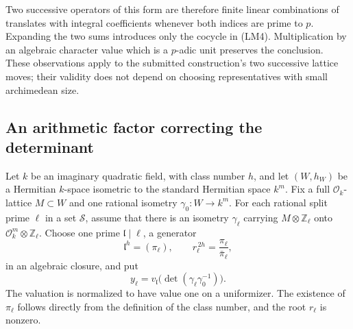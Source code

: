 Two successive operators of this form are therefore finite
linear combinations of translates with integral coefficients
whenever both indices are prime to $p$.  Expanding the two sums
introduces only the cocycle in (LM4).  Multiplication by an
algebraic character value which is a $p$-adic unit preserves
the conclusion.  These observations apply to the submitted
construction's two successive lattice moves; their validity
does not depend on choosing representatives with small
archimedean size.

\subsection{An arithmetic factor correcting the determinant}

Let $k$ be an imaginary quadratic field, with class number $h$,
and let $(W,h_W)$ be a Hermitian $k$-space isometric to the
standard Hermitian space $k^m$.  Fix a full
$\mathcal O_k$-lattice $M\subset W$ and one rational isometry
$\gamma_0:W\to k^m$.  For each rational split prime $\ell$ in
a set $\mathcal S$, assume that there is an isometry
$\gamma_\ell$ carrying
$M\otimes\mathbb Z_\ell$ onto
$\mathcal O_k^m\otimes\mathbb Z_\ell$.
Choose one prime $\mathfrak l\mid\ell$, a generator
\[
       \mathfrak l^h=(\pi_\ell),\qquad
       r_\ell^{\,2h}=\frac{\pi_\ell}{\bar\pi_\ell},
 \tag{LM8}
\]
in an algebraic closure, and put
\[
 y_\ell=v_{\mathfrak l}
             \bigl(\det(\gamma_\ell\gamma_0^{-1})\bigr).
 \tag{LM9}
\]
The valuation is normalized to have value one on a uniformizer.
The existence of $\pi_\ell$ follows directly from the definition
of the class number, and the root $r_\ell$ is nonzero.

